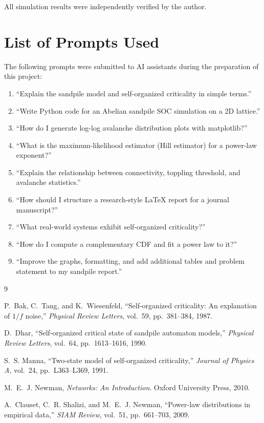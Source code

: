\documentclass[12pt,a4paper]{article}
\begin{document}
All simulation results were independently verified by the author.

\section{List of Prompts Used}
\label{sec:prompts}

The following prompts were submitted to AI assistants during the preparation of
this project:

\begin{enumerate}[noitemsep]
  \item ``Explain the sandpile model and self-organized criticality in simple terms.''
  \item ``Write Python code for an Abelian sandpile SOC simulation on a 2D lattice.''
  \item ``How do I generate log-log avalanche distribution plots with matplotlib?''
  \item ``What is the maximum-likelihood estimator (Hill estimator) for a power-law exponent?''
  \item ``Explain the relationship between connectivity, toppling threshold, and avalanche statistics.''
  \item ``How should I structure a research-style LaTeX report for a journal manuscript?''
  \item ``What real-world systems exhibit self-organized criticality?''
  \item ``How do I compute a complementary CDF and fit a power law to it?''
  \item ``Improve the graphs, formatting, and add additional tables and problem statement to my sandpile report.''
\end{enumerate}


\begin{thebibliography}{9}

P.~Bak, C.~Tang, and K.~Wiesenfeld,
``Self-organized criticality: An explanation of $1/f$ noise,''
\textit{Physical Review Letters}, vol.~59, pp.~381--384, 1987.

D.~Dhar,
``Self-organized critical state of sandpile automaton models,''
\textit{Physical Review Letters}, vol.~64, pp.~1613--1616, 1990.

S.~S. Manna,
``Two-state model of self-organized criticality,''
\textit{Journal of Physics A}, vol.~24, pp.~L363--L369, 1991.

M.~E.~J. Newman,
\textit{Networks: An Introduction}.
Oxford University Press, 2010.

A.~Clauset, C.~R. Shalizi, and M.~E.~J. Newman,
``Power-law distributions in empirical data,''
\textit{SIAM Review}, vol.~51, pp.~661--703, 2009.

\end{thebibliography}
\end{document}
